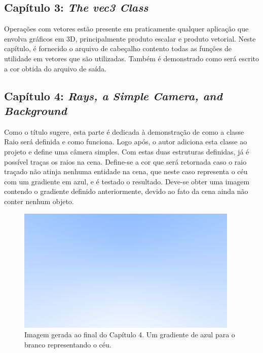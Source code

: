 \documentclass[journal]{IEEEtran}
\begin{document}
\subsection*{Capítulo 3: \emph{The vec3 Class}}
Operações com vetores estão presente em praticamente qualquer aplicação que envolva gráficos em 3D,
principalmente produto escalar e produto vetorial. Neste capítulo, é fornecido o arquivo de 
cabeçalho contento todas as funções de utilidade em vetores que são utilizadas. Também é demonstrado
como será escrito a cor obtida do arquivo de saída.

\subsection*{Capítulo 4: \emph{Rays, a Simple Camera, and Background}}
Como o título sugere, esta parte é dedicada à demonstração de como a classe Raio será definida e
como funciona. Logo após, o autor adiciona esta classe ao projeto e define uma câmera simples.
Com estas duas estruturas definidas, já
é possível traças os raios na cena. Define-se a cor que será retornada caso o raio traçado não
atinja nenhuma entidade na cena, que neste caso representa o céu com um gradiente em azul, e é testado
o resultado. Deve-se obter uma imagem contendo o gradiente definido anteriormente, devido ao fato
da cena ainda não conter nenhum objeto.

\begin{figure}[ht]
  \centering
  \includegraphics[width=\linewidth]{media/img-1.02-blue-to-white.png}
  \caption{Imagem gerada ao final do Capítulo 4. Um gradiente de azul para o branco representando o céu.}
  \label{img_blue_grad}
\end{figure}
\end{document}
